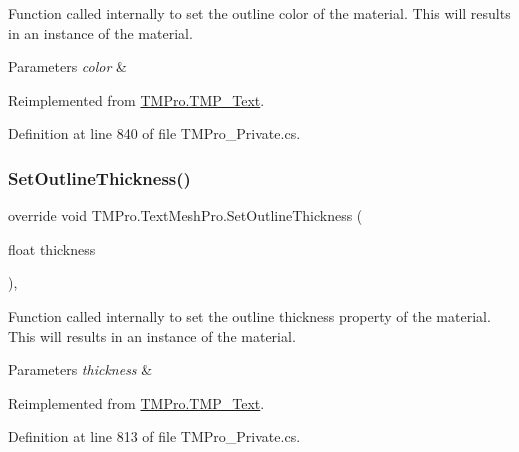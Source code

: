 Function called internally to set the outline color of the material. This will results in an instance of the material. 


\begin{DoxyParams}{Parameters}
{\em color} & \\
\hline
\end{DoxyParams}


Reimplemented from \mbox{\hyperlink{class_t_m_pro_1_1_t_m_p___text_a726c0894801737f281ecf5656e9ee4d0}{T\+M\+Pro.\+T\+M\+P\+\_\+\+Text}}.



Definition at line 840 of file T\+M\+Pro\+\_\+\+Private.\+cs.

\mbox{\label{class_t_m_pro_1_1_text_mesh_pro_a056fd074419594f0dde096f9b264dc90}} 
\subsubsection{\texorpdfstring{SetOutlineThickness()}{SetOutlineThickness()}}
{\footnotesize\ttfamily override void T\+M\+Pro.\+Text\+Mesh\+Pro.\+Set\+Outline\+Thickness (\begin{DoxyParamCaption}\item[{float}]{thickness }\end{DoxyParamCaption})\hspace{0.3cm}{\ttfamily [protected]}, {\ttfamily [virtual]}}



Function called internally to set the outline thickness property of the material. This will results in an instance of the material. 


\begin{DoxyParams}{Parameters}
{\em thickness} & \\
\hline
\end{DoxyParams}


Reimplemented from \mbox{\hyperlink{class_t_m_pro_1_1_t_m_p___text_a64858ad286418942ec69bc438eec39d4}{T\+M\+Pro.\+T\+M\+P\+\_\+\+Text}}.



Definition at line 813 of file T\+M\+Pro\+\_\+\+Private.\+cs.

\mbox{\label{class_t_m_pro_1_1_text_mesh_pro_a3039c7fdff495b48bcefedd0d0d3bc07}} 
